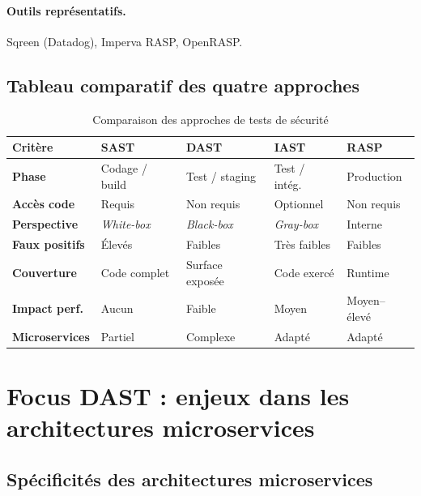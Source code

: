 \paragraph{Outils représentatifs.}
Sqreen (Datadog), Imperva RASP, OpenRASP.

\subsection{Tableau comparatif des quatre approches}

\begin{table}[H]
  \centering
  \caption{Comparaison des approches de tests de sécurité}
  \label{tab:comparaison_tests}
  \renewcommand{\arraystretch}{1.4}
  \begin{tabularx}{\textwidth}{
    >{\bfseries}L{2cm} C{2.2cm} C{2.2cm} C{2.2cm} C{2.2cm}
  }
    \toprule
    Critère & SAST & DAST & IAST & RASP \\
    \midrule
    Phase & Codage / build & Test / staging & Test / intég. & Production \\
    Accès code & Requis & Non requis & Optionnel & Non requis \\
    Perspective & \textit{White-box} & \textit{Black-box} & \textit{Gray-box} & Interne \\
    Faux positifs & Élevés & Faibles & Très faibles & Faibles \\
    Couverture & Code complet & Surface exposée & Code exercé & Runtime \\
    Impact perf. & Aucun & Faible & Moyen & Moyen--élevé \\
    Microservices & Partiel & Complexe & Adapté & Adapté \\
    \bottomrule
  \end{tabularx}
\end{table}

\section{Focus DAST : enjeux dans les architectures microservices}

\subsection{Spécificités des architectures microservices}

